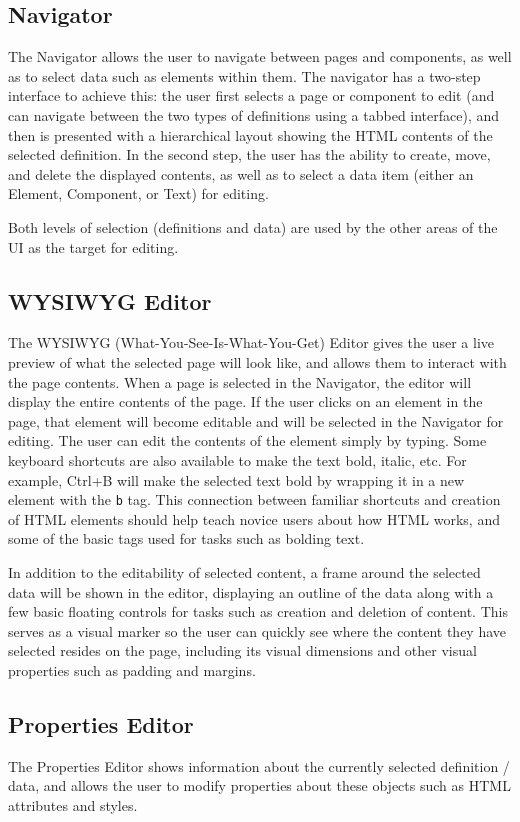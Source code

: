 \documentclass[conference, letterpaper]{IEEEtran}
\begin{document}
\subsection{Navigator}
The Navigator allows the user to navigate between pages and components, as well as to select data such as elements within them. The navigator has a two-step interface to achieve this: the user first selects a page or component to edit (and can navigate between the two types of definitions using a tabbed interface), and then is presented with a hierarchical layout showing the HTML contents of the selected definition. In the second step, the user has the ability to create, move, and delete the displayed contents, as well as to select a data item (either an Element, Component, or Text) for editing.

Both levels of selection (definitions and data) are used by the other areas of the UI as the target for editing.

\subsection{WYSIWYG Editor}
The WYSIWYG (What-You-See-Is-What-You-Get) Editor gives the user a live preview of what the selected page will look like, and allows them to interact with the page contents. When a page is selected in the Navigator, the editor will display the entire contents of the page. If the user clicks on an element in the page, that element will become editable and will be selected in the Navigator for editing. The user can edit the contents of the element simply by typing. Some keyboard shortcuts are also available to make the text bold, italic, etc. For example, Ctrl+B will make the selected text bold by wrapping it in a new element with the \texttt{b} tag. This connection between familiar shortcuts and creation of HTML elements should help teach novice users about how HTML works, and some of the basic tags used for tasks such as bolding text.

In addition to the editability of selected content, a frame around the selected data will be shown in the editor, displaying an outline of the data along with a few basic floating controls for tasks such as creation and deletion of content. This serves as a visual marker so the user can quickly see where the content they have selected resides on the page, including its visual dimensions and other visual properties such as padding and margins.

\subsection{Properties Editor}
The Properties Editor shows information about the currently selected definition / data, and allows the user to modify properties about these objects such as HTML attributes and styles.
\end{document}
